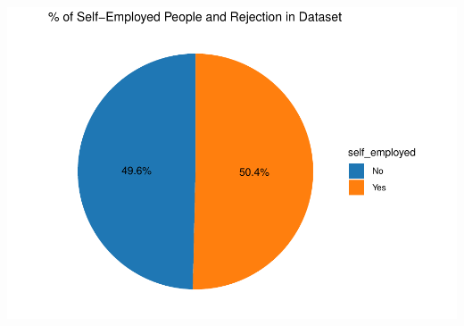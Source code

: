 \documentclass[
]{article}
\begin{document}
\includegraphics{Loan_approval_files/figure-latex/unnamed-chunk-16-1.pdf}
\end{document}
